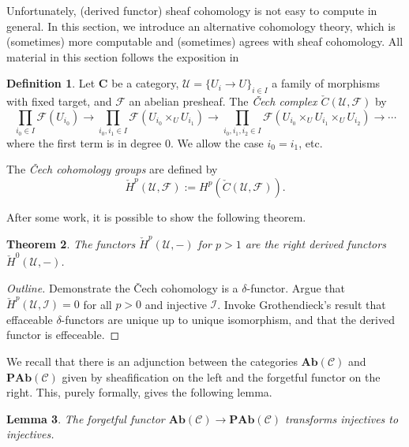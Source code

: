 \documentclass{amsart}
\newcommand{\Ab}{\mathbf{Ab}}
\newcommand{\PAb}{\mathbf{PAb}}
\newtheorem{theorem}{Theorem}[section]
\newtheorem{lemma}[theorem]{Lemma}
\theoremstyle{definition}
\newtheorem{definition}[theorem]{Definition}
\theoremstyle{remark}
\begin{document}
Unfortunately, (derived functor) sheaf cohomology is not easy to compute in
general. In this section, we introduce an alternative cohomology theory, which
is (sometimes) more computable and (sometimes) agrees with sheaf cohomology. All
material in this section follows the exposition in
\cite[\href{https://stacks.math.columbia.edu/tag/03OK}{Tag
    03OK}]{stacks-project}

\begin{definition}
    Let $\mathbf{C}$ be a category, $\mathcal{U} = \{U_i \to U\}_{i \in I}$ a
    family of morphisms with fixed target, and $\mathcal{F}$ an abelian
    presheaf. The \textit{\v{C}ech complex $\check{C}(\mathcal{U},
        \mathcal{F})$} by
    \[
        \prod_{i_0 \in I} \mathcal{F}(U_{i_0})
        \to \prod_{i_0, i_1\in I} \mathcal{F}(U_{i_0} \times_U U_{i_1})
        \to \prod_{i_0, i_1, i_2 \in I} \mathcal{F}(U_{i_0} \times_U U_{i_1}
        \times_U U_{i_2}) \to \cdots
    \]
    where the first term is in degree $0$. We allow the case $i_0 = i_1$, etc.

    The \textit{\v{C}ech cohomology groups} are defined by
    \[
        \check{H}^p(\mathcal{U}, \mathcal{F}) := H^p(\check{C}(\mathcal{U},
        \mathcal{F})).
    \]
\end{definition}

After some work, it is possible to show the following theorem.

\begin{theorem}
    The functors $\check{H}^p(\mathcal{U}, {-})$ for $p > 1$ are the right
    derived functors $\check{H}^0(\mathcal{U}, {-})$.
\end{theorem}

\begin{proof}[Outline]
    Demonstrate the \v{C}ech cohomology is a $\delta$-functor. Argue that
    $\check{H}^p(\mathcal{U}, \mathcal{I}) = 0$ for all $p > 0$ and injective
    $\mathcal{I}$. Invoke Grothendieck's result that effaceable
    $\delta$-functors are unique up to unique isomorphism, and that the derived
    functor is effeceable.
\end{proof}

We recall that there is an adjunction between the categories $\Ab(\mathcal{C})$
and $\PAb(\mathcal{C})$ given by sheafification on the left and the forgetful
functor on the right. This, purely formally, gives the following lemma.

\begin{lemma}
    The forgetful functor $\Ab(\mathcal{C}) \to \PAb(\mathcal{C})$ transforms
    injectives to injectives.
\end{lemma}
\end{document}

